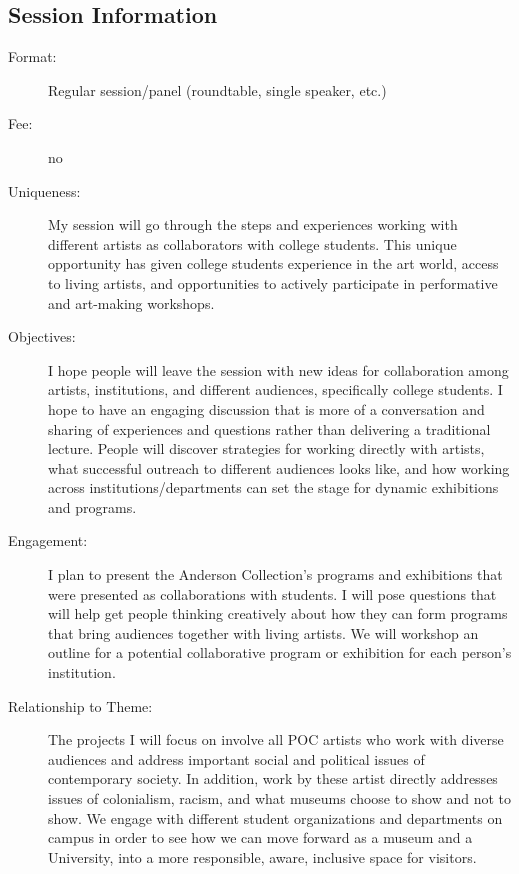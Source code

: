 \documentclass{report}
\begin{document}
              \subsection*{Session Information}
                \begin{description}
                  \item [Format:] Regular session/panel (roundtable, single speaker, etc.)
							    
								  \item [Fee:]no
							     
							    \item [Uniqueness:]My session will go through the steps and experiences working with different artists as collaborators with college students. This unique opportunity has given college students experience in the art world, access to living artists, and opportunities to actively participate in performative and art-making workshops.
							    \item [Objectives:]I hope people will leave the session with new ideas for collaboration among artists, institutions, and different audiences, specifically college students. I hope to have an engaging discussion that is more of a conversation and sharing of experiences and questions rather than delivering a traditional lecture. People will discover strategies for working directly with artists, what successful outreach to different audiences looks like, and how working across institutions/departments can set the stage for dynamic exhibitions and programs.
							    \item [Engagement:]I plan to present the Anderson Collection's programs and exhibitions that were  presented as collaborations with students. I will pose questions that will help get people thinking creatively about how they can form programs that bring audiences together with living artists. We will workshop an outline for a potential collaborative program or exhibition for each person's institution.
							    \item [Relationship to Theme:]The projects I will focus on involve all POC artists who work with diverse audiences and address important social and political issues of contemporary society. In addition, work by these artist directly addresses issues of colonialism, racism, and what museums choose to show and not to show. We engage with different student organizations and departments on campus in order to see how we can move forward as a museum and a University, into a more responsible, aware, inclusive space for visitors.
							    
                \end{description}
\end{document}
